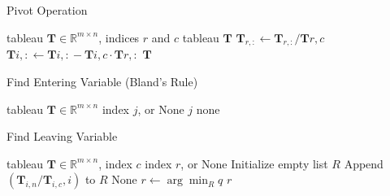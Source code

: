 \documentclass[conference]{IEEEtran}
\begin{document}
\begin{algorithm}
\caption{Pivot Operation}
\label{alg:pivot}
\begin{algorithmic}[1]
\Require tableau $\textbf{T} \in \mathbb{R}^{m \times n}$, indices $r$ and $c$
\Ensure tableau $\textbf{T}$
\State $\textbf{T}_{r, :} \gets \textbf{T}_{r, :} / \textbf{T}{r, c}$ 
    \State $\textbf{T}{i, :} \gets \textbf{T}{i, :} - \textbf{T}{i, c} \cdot \textbf{T}{r, :}$ 
\EndFor
\State \Return $\textbf{T}$ 
\end{algorithmic}
\end{algorithm}

\begin{algorithm}
\caption{Find Entering Variable (Bland's Rule)}
\label{alg:entering}
\begin{algorithmic}[1]
\Require tableau $\textbf{T} \in \mathbb{R}^{m \times n}$ 
\Ensure index $j$, or None
        \State \Return $j$ 
    \EndIf
\EndFor
\State \Return none 
\end{algorithmic}
\end{algorithm}

\begin{algorithm}
\caption{Find Leaving Variable}
\label{alg:leaving}
\begin{algorithmic}[1]
\Require tableau $\textbf{T} \in \mathbb{R}^{m \times n}$, index $c$
\Ensure index $r$, or None
\State Initialize empty list $R$
        \State Append $(\textbf{T}_{i, n} / \textbf{T}_{i, c}, i)$ to $R$
    \EndIf
\EndFor
{}
    \State \Return None 
\EndIf
\State $r \gets \arg \min_R q$ 
\State \Return $r$ 
\end{algorithmic}
\end{algorithm}
\end{document}
